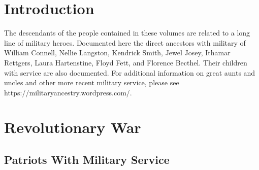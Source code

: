 \documentclass[11pt,letter]{book}
\begin{document}
\tableofcontents
\mainmatter
\chapter{Introduction}

The descendants of the people contained in these volumes are related to a long line of military heroes.  Documented here the direct ancestors with military of William Connell, Nellie Langston, Kendrick Smith, Jewel Josey, Ithamar Rettgers, Laura Hartenstine, Floyd Fett, and Florence Becthel.  Their children with service are also documented.  For additional information on great aunts and uncles and other more recent military service, please see https://militaryancestry.wordpress.com/.

\chapter{Revolutionary War}

\section{Patriots With Military Service}
\end{document}
